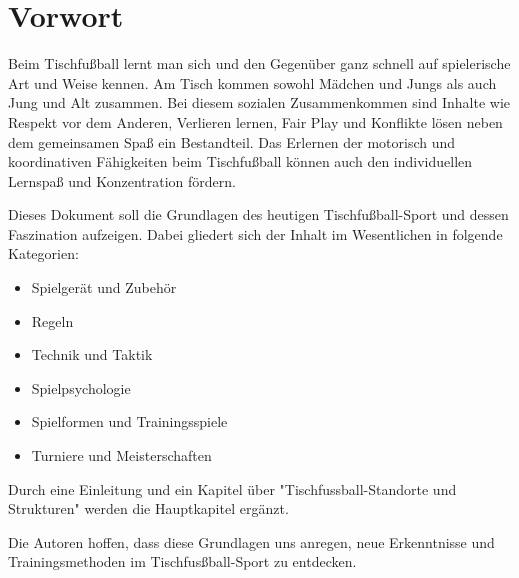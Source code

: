 \chapter*{Vorwort}

Beim Tischfußball lernt man sich und den Gegenüber ganz schnell auf spielerische Art und Weise kennen. Am Tisch kommen sowohl Mädchen und Jungs als auch Jung und Alt zusammen. Bei diesem sozialen Zusammenkommen sind Inhalte wie Respekt vor dem Anderen, Verlieren lernen, Fair Play und Konflikte lösen neben dem gemeinsamen Spaß ein Bestandteil. Das Erlernen der motorisch und koordinativen Fähigkeiten beim Tischfußball können auch den individuellen Lernspaß und Konzentration fördern. 

Dieses Dokument soll die Grundlagen des heutigen Tischfußball-Sport und dessen Faszination aufzeigen. Dabei gliedert sich der Inhalt im Wesentlichen in folgende Kategorien:
\begin{itemize}
\item Spielgerät und Zubehör
\item Regeln
\item Technik und Taktik
\item Spielpsychologie 
\item Spielformen und Trainingsspiele
\item Turniere und Meisterschaften
\end{itemize}
Durch eine Einleitung und ein Kapitel über "Tischfussball-Standorte und Strukturen" werden die Hauptkapitel ergänzt. 

Die Autoren hoffen, dass diese Grundlagen uns anregen, neue Erkenntnisse und Trainingsmethoden im Tischfusßball-Sport zu entdecken.
